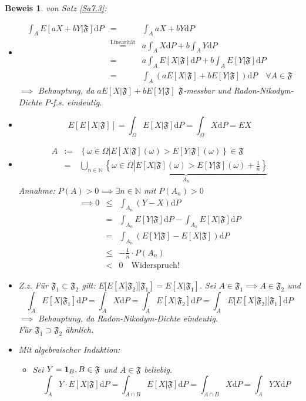 \documentclass[a4paper,11pt]{scrbook}
\newcommand{\N}{{\mathbb N}}
\newcommand{\ind}{\text{\bf{1}}}
\def\FF{ \mathfrak{F} }
\def\folgt{\ensuremath{\implies}}
\def\d{\mbox{d}}
\theoremstyle{nonumberplain}
\newtheorem{Bew}{Beweis}
\begin{document}

\begin{Bew} von Satz \ref{Sa7.3}:
\begin{itemize}
\item[a)]
\begin{eqnarray*}
\int_A E[aX+bY|\FF]\d P &=& \int_A aX+bY\d P \\
&\stackrel{\text{Linearität}}{=}& a\int_A X\d P + b\int_A Y\d P \\
&=& a\int_A E[X|\FF]\d P + b\int_A E[Y|\FF]\d P \\
&=& \int_A \left(aE[X|\FF] + bE[Y|\FF]\right)\d P \quad\forall A\in\FF
\end{eqnarray*}
$\folgt$ Behauptung, da $aE[X|\FF] + bE[Y|\FF]$ $\FF$-messbar und Radon-Nikodym-Dichte $P$-f.s. eindeutig.
\item[b)]
$$E[E[X|\FF]] = \int_\Omega E[X|\FF]\d P = \int_\Omega X\d P = EX$$
\item[c)]
\begin{eqnarray*}
A&:=&\left\{\omega\in\Omega\left| E[X|\FF](\omega)>E[Y|\FF](\omega)\right.\right\}\in\FF\\
&=& \bigcup_{n\in\N}\underbrace{\left\{\omega\in\Omega\left|E[X|\FF](\omega)>E[Y|\FF](\omega)+\frac 1 n\right.\right\}}_{A_n}
\end{eqnarray*}
Annahme: $P(A)>0 \folgt\exists n\in\N$ mit $P(A_n) > 0$
\begin{eqnarray*}
\folgt 0 &\le& \int_{A_n}(Y-X)\d P\\
&=&\int_{A_n}E[Y|\FF]\d P - \int_{A_n} E[X|\FF]\d P \\
&=&\int_{A_n}\left(E[Y|\FF]-E[X|\FF]\right)\d P\\
&\le& -\frac 1 n \cdot P(A_n)\\
&<& 0 \quad\text{Widerspruch!}
\end{eqnarray*}
\item[d)] Z.z. Für $\FF_1\subset\FF_2$ gilt: $E[E[X|\FF_2]|\FF_1] = E[X|\FF_1].$ Sei $A\in\FF_1\folgt A\in\FF_2$ und
$$\int_A E[X|\FF_1]\d P = \int_A X\d P = \int_A E[X|\FF_2]\d P = \int_A E[E[X|\FF_2]|\FF_1] \d P$$
$\folgt$ Behauptung, da Radon-Nikodym-Dichte eindeutig.\\
Für $\FF_1\supset\FF_2$ ähnlich.
\item[e)] Mit algebraischer Induktion:
\begin{itemize}
\item Sei $Y = \ind_B, B\in\FF$ und $A\in\FF$ beliebig.
$$\int_A Y\cdot E[X|\FF]\d P = \int_{A\cap B} E[X|\FF]\d P = \int_{A\cap B} X\d P = \int_A YX\d P$$

\end{itemize}
\end{itemize}
\end{Bew}
\end{document}
